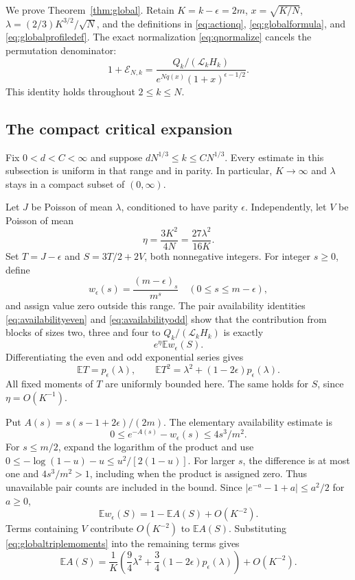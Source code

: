 \documentclass[11pt]{article}
\theoremstyle{definition}
\theoremstyle{remark}
\newcommand{\E}{\mathbb E}
\newcommand{\1}{\mathbf 1}
\begin{document}
We prove Theorem~\ref{thm:global}. Retain $K=k-\epsilon=2m$, $x=\sqrt{K/N}$, $\lambda=(2/3)K^{3/2}/\sqrt N$, and the definitions in \eqref{eq:actionq}, \eqref{eq:globalformula}, and \eqref{eq:globalprofiledef}. The exact normalization \eqref{eq:qnormalize} cancels the permutation denominator:
\begin{equation}\label{eq:globalcancel}
1+\mathcal E_{N,k}
=\frac{Q_k/(\mathcal L_kH_k)}{e^{Nq(x)}(1+x)^{\epsilon-1/2}}.
\end{equation}
This identity holds throughout $2\le k\le N$.

\subsection{The compact critical expansion}

Fix $0<d<C<\infty$ and suppose $dN^{1/3}\le k\le CN^{1/3}$. Every estimate in this subsection is uniform in that range and in parity. In particular, $K\to\infty$ and $\lambda$ stays in a compact subset of $(0,\infty)$.

Let $J$ be Poisson of mean $\lambda$, conditioned to have parity $\epsilon$. Independently, let $V$ be Poisson of mean
\[
\eta=\frac{3K^2}{4N}=\frac{27\lambda^2}{16K}.
\]
Set $T=J-\epsilon$ and $S=3T/2+2V$, both nonnegative integers. For integer $s\ge0$, define
\[
w_\epsilon(s)=\frac{(m-\epsilon)_s}{m^s}
\quad(0\le s\le m-\epsilon),
\]
and assign value zero outside this range. The pair availability identities \eqref{eq:availabilityeven} and \eqref{eq:availabilityodd} show that the contribution from blocks of sizes two, three and four to $Q_k/(\mathcal L_kH_k)$ is exactly
\begin{equation}\label{eq:globalconditioned}
e^\eta\E w_\epsilon(S).
\end{equation}
Differentiating the even and odd exponential series gives
\begin{equation}\label{eq:globaltriplemoments}
\E T=p_\epsilon(\lambda),\qquad
\E T^2=\lambda^2+(1-2\epsilon)p_\epsilon(\lambda).
\end{equation}
All fixed moments of $T$ are uniformly bounded here. The same holds for $S$, since $\eta=O(K^{-1})$.

Put $A(s)=s(s-1+2\epsilon)/(2m)$. The elementary availability estimate is
\[
0\le e^{-A(s)}-w_\epsilon(s)\le4s^3/m^2.
\]
For $s\le m/2$, expand the logarithm of the product and use
$0\le-\log(1-u)-u\le u^2/[2(1-u)]$. For larger $s$, the difference is at most one and $4s^3/m^2>1$, including when the product is assigned zero. Thus unavailable pair counts are included in the bound. Since $|e^{-a}-1+a|\le a^2/2$ for $a\ge0$,
\[
\E w_\epsilon(S)=1-\E A(S)+O(K^{-2}).
\]
Terms containing $V$ contribute $O(K^{-2})$ to $\E A(S)$. Substituting \eqref{eq:globaltriplemoments} into the remaining terms gives
\begin{equation}\label{eq:globalavailabilitymean}
\E A(S)=\frac1K\left(\frac94\lambda^2
+\frac34(1-2\epsilon)p_\epsilon(\lambda)\right)+O(K^{-2}).
\end{equation}
\end{document}
